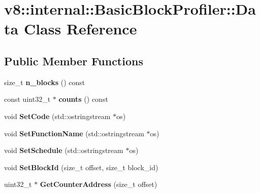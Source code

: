 \hypertarget{classv8_1_1internal_1_1_basic_block_profiler_1_1_data}{}\section{v8\+:\+:internal\+:\+:Basic\+Block\+Profiler\+:\+:Data Class Reference}
\label{classv8_1_1internal_1_1_basic_block_profiler_1_1_data}
\subsection*{Public Member Functions}
\begin{DoxyCompactItemize}
\item 
size\+\_\+t {\bfseries n\+\_\+blocks} () const \hypertarget{classv8_1_1internal_1_1_basic_block_profiler_1_1_data_ae6a480b10dae1fbb14ef176312d04b4d}{}\label{classv8_1_1internal_1_1_basic_block_profiler_1_1_data_ae6a480b10dae1fbb14ef176312d04b4d}

\item 
const uint32\+\_\+t $\ast$ {\bfseries counts} () const \hypertarget{classv8_1_1internal_1_1_basic_block_profiler_1_1_data_af3967d5bbff3d58c8a921d5943f6c2c2}{}\label{classv8_1_1internal_1_1_basic_block_profiler_1_1_data_af3967d5bbff3d58c8a921d5943f6c2c2}

\item 
void {\bfseries Set\+Code} (std\+::ostringstream $\ast$os)\hypertarget{classv8_1_1internal_1_1_basic_block_profiler_1_1_data_a4eb5bc5ffe21e67d2ee24e6111ba0950}{}\label{classv8_1_1internal_1_1_basic_block_profiler_1_1_data_a4eb5bc5ffe21e67d2ee24e6111ba0950}

\item 
void {\bfseries Set\+Function\+Name} (std\+::ostringstream $\ast$os)\hypertarget{classv8_1_1internal_1_1_basic_block_profiler_1_1_data_ae867aa9aedc5e53622b2a0ab0f747a3f}{}\label{classv8_1_1internal_1_1_basic_block_profiler_1_1_data_ae867aa9aedc5e53622b2a0ab0f747a3f}

\item 
void {\bfseries Set\+Schedule} (std\+::ostringstream $\ast$os)\hypertarget{classv8_1_1internal_1_1_basic_block_profiler_1_1_data_a825e148b427e8231ddd9f995e371a73e}{}\label{classv8_1_1internal_1_1_basic_block_profiler_1_1_data_a825e148b427e8231ddd9f995e371a73e}

\item 
void {\bfseries Set\+Block\+Id} (size\+\_\+t offset, size\+\_\+t block\+\_\+id)\hypertarget{classv8_1_1internal_1_1_basic_block_profiler_1_1_data_afc3b160cd6a0ebd96a7c745ac72ec9a3}{}\label{classv8_1_1internal_1_1_basic_block_profiler_1_1_data_afc3b160cd6a0ebd96a7c745ac72ec9a3}

\item 
uint32\+\_\+t $\ast$ {\bfseries Get\+Counter\+Address} (size\+\_\+t offset)\hypertarget{classv8_1_1internal_1_1_basic_block_profiler_1_1_data_aba31658c962e9e6ecf56e5961e4eff2d}{}\label{classv8_1_1internal_1_1_basic_block_profiler_1_1_data_aba31658c962e9e6ecf56e5961e4eff2d}

\end{DoxyCompactItemize}

